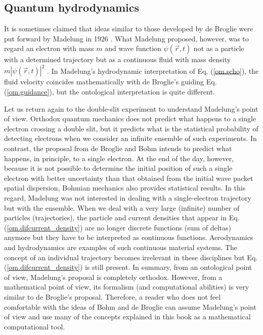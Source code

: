 \documentclass[nofootinbib, secnumarabic, amsmath, nobibnotes,10pt,aps,pra]{revtex4-1}
\newcommand{\eref}[1]{Eq. (\ref{#1})}
\newcommand{\abs}[1]{\left| #1 \right|} %
\begin{document}
\subsection{Quantum hydrodynamics}\label{om.sec_intro.9}

It is sometimes claimed that ideas similar to those developed by de Broglie were put forward by Madelung in 1926 \cite{om.Madelung}. What Madelung proposed, however, was to regard an electron with mass $m$ and wave function $\psi(\vec{r},t)$ not as a particle with a determined trajectory but as a continuous fluid with mass density $m \abs{\psi(\vec{r},t)}^2$ \cite{om.wyatt2005,om.Takabayasi}. In Madelung's hydrodynamic interpretation of \eref{om.scho}, the fluid velocity coincides mathematically with de Broglie's guiding \eref{om.guidance}, but the ontological interpretation is quite different.

Let us return again to the double-slit experiment to understand Madelung's point of view. Orthodox quantum mechanics does not predict what happens to a single electron crossing a double slit, but it predicts what is the statistical probability of detecting electrons when we consider an infinite ensemble of such experiments. In contrast, the proposal from de Broglie and Bohm intends to predict what happens, in principle, to a single electron. At the end of the day, however, because it is not possible to determine the initial position of such a single electron with better uncertainty than that obtained from the initial wave packet spatial dispersion, Bohmian mechanics also provides statistical results.
In this regard, Madelung was not interested in dealing with a single-electron trajectory but with the ensemble. When we deal with a very large (infinite) number of particles (trajectories), the particle and current densities that appear in \eref{om.difcurrent_density} are no longer discrete functions (sum of deltas) anymore but they have to be interpreted as continuous functions. Aerodynamics and hydrodynamics are examples of such continuous material systems. The concept of an individual trajectory becomes irrelevant in these disciplines but \eref{om.difcurrent_density} is still present. In summary, from an ontological point of view, Madelung's proposal is completely orthodox. However, from a mathematical point of view, its formalism (and computational abilities) is very similar to de Broglie's proposal. Therefore, a reader who does not feel comfortable with the ideas of Bohm and de Broglie can assume Madelung's point of view and use many of the concepts explained in this book as a mathematical computational tool.
\end{document}
